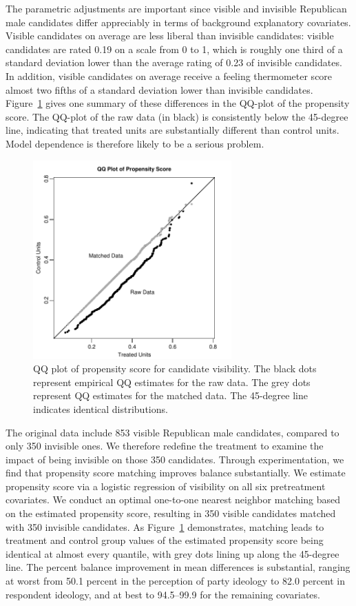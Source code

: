 \documentclass[11pt,titlepage]{article}
\begin{document}
The parametric adjustments are important since visible and invisible
Republican male candidates differ appreciably in terms of background
explanatory covariates.  Visible candidates on average are less
liberal than invisible candidates: visible candidates are rated 0.19
on a scale from 0 to 1, which is roughly one third of a standard
deviation lower than the average rating of 0.23 of invisible
candidates.  In addition, visible candidates on average receive a
feeling thermometer score almost two fifths of a standard deviation
lower than invisible candidates.  Figure~\ref{fg:kochQQ} gives one
summary of these differences in the QQ-plot of the propensity score.
The QQ-plot of the raw data (in black) is consistently below the
45-degree line, indicating that treated units are substantially
different than control units.  Model dependence is therefore likely to
be a serious problem.
\begin{figure}[t] 
 \begin{center}
   \includegraphics[height=3in,angle=0]{figs/kochqq.pdf}
 \end{center} 
 \vspace{-0.275in}
 \caption{QQ plot of propensity score for candidate visibility. The
   black dots represent empirical QQ estimates for the raw data.  The
   grey dots represent QQ estimates for the matched data.  The
   45-degree line indicates identical distributions.}
 \label{fg:kochQQ}
\end{figure}

The original data include 853 visible Republican male candidates,
compared to only 350 invisible ones.  We therefore redefine the
treatment to examine the impact of being invisible on those 350
candidates.  Through experimentation, we find that propensity score
matching improves balance substantially.  We estimate propensity score
via a logistic regression of visibility on all six pretreatment
covariates.  We conduct an optimal one-to-one nearest neighbor
matching based on the estimated propensity score, resulting in 350
visible candidates matched with 350 invisible candidates.  As
Figure~\ref{fg:kochQQ} demonstrates, matching leads to treatment and
control group values of the estimated propensity score being identical
at almost every quantile, with grey dots lining up along the 45-degree
line.  The percent balance improvement in mean differences is
substantial, ranging at worst from 50.1 percent in the perception of
party ideology to 82.0 percent in respondent ideology, and at best to
94.5--99.9 for the remaining covariates.
\end{document}
